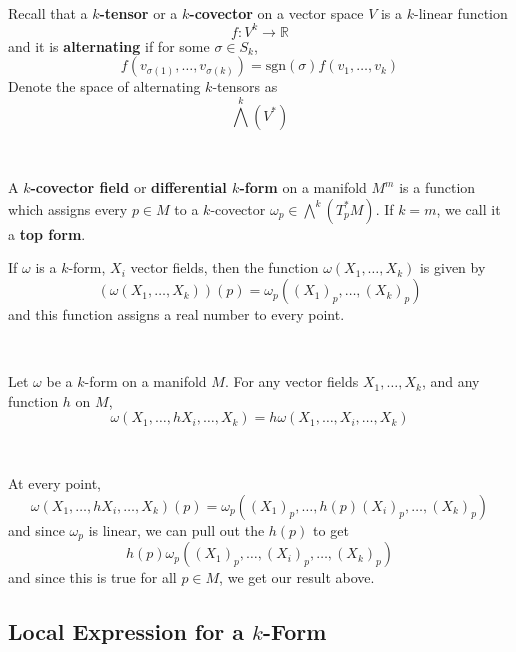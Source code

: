 \documentclass{article}
\begin{document}
\begin{remark}
  \

  Recall that a \textbf{$k$-tensor} or a \textbf{$k$-covector} on a vector space $V$ is a $k$-linear function $$f:  V^k \to \mathbb{R}$$and it is \textbf{alternating} if for some $\sigma \in S_k$, $$f(v_{\sigma(1)},\dots, v_{\sigma(k)}) = \text{sgn}(\sigma)f(v_1, \dots, v_k)$$Denote the space of alternating $k$-tensors as $$\bigwedge^k(V^*)$$
\end{remark}

\begin{definition}[$k$-forms]
  \

  A \textbf{$k$-covector field} or \textbf{differential $k$-form} on a manifold $M^m$ is a function which assigns every $p \in M$ to a $k$-covector $\omega_p \in \bigwedge^k(T^*_pM)$. If $k = m$, we call it a \textbf{top form}.

  If $\omega$ is a $k$-form, $X_i$ vector fields, then the function $\omega(X_1, \dots, X_k )$ is given by $$(\omega(X_1,\dots, X_k))(p) = \omega_p((X_1)_p, \dots, (X_k)_p)$$and this function assigns a real number to every point.
\end{definition}

\begin{proposition}
  \

  Let $\omega$ be a $k$-form on a manifold $M$. For any vector fields $X_1, \dots, X_k$, and any function $h$ on $M$, $$\omega(X_1, \dots, hX_i, \dots, X_k) = h\omega(X_1, \dots, X_i, \dots, X_k)$$
\end{proposition}

\begin{customproof}
  \

  At every point, $$\omega(X_1, \dots, hX_i, \dots, X_k)(p) = \omega_p((X_1)_p, \dots, h(p)(X_i)_p, \dots, (X_k)_p)$$and since $\omega_p$ is linear, we can pull out the $h(p)$ to get $$h(p)\omega_p((X_1)_p, \dots, (X_i)_p, \dots, (X_k)_p)$$and since this is true for all $p \in M$, we get our result above.
\end{customproof}

\subsection{Local Expression for a $k$-Form}
\
\end{document}
